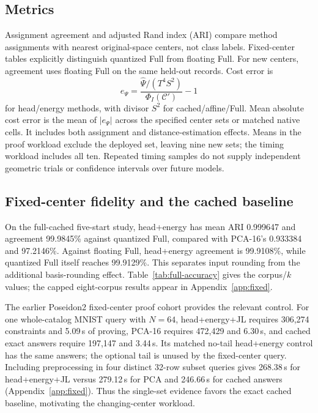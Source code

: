 \subsection{Metrics}
Assignment agreement and adjusted Rand index (ARI) compare method assignments with nearest original-space centers, not class labels. Fixed-center tables explicitly distinguish quantized Full from floating Full. For new centers, agreement uses floating Full on the same held-out records. Cost error is
\begin{equation}
e_\Psi=\frac{\widehat\Psi/(T^4S^2)}{\Phi_I(\mathcal C')}-1
\end{equation}
for head/energy methods, with divisor $S^2$ for cached/affine/Full. Mean absolute cost error is the mean of $|e_\Psi|$ across the specified center sets or matched native cells. It includes both assignment and distance-estimation effects. Means in the proof workload exclude the deployed set, leaving nine new sets; the timing workload includes all ten. Repeated timing samples do not supply independent geometric trials or confidence intervals over future models.



\subsection{Fixed-center fidelity and the cached baseline}\label{sec:results}
On the full-cached five-start study, head+energy has mean ARI 0.999647 and agreement 99.9845\% against quantized Full, compared with PCA-16's 0.933384 and 97.2146\%. Against floating Full, head+energy agreement is 99.9108\%, while quantized Full itself reaches 99.9129\%. This separates input rounding from the additional basis-rounding effect. Table~\ref{tab:full-accuracy} gives the corpus/$k$ values; the capped eight-corpus results appear in Appendix~\ref{app:fixed}.


The earlier Poseidon2 fixed-center proof cohort provides the relevant control. For one whole-catalog MNIST query with $N=64$, head+energy+JL requires 306,274 constraints and 5.09\,s of proving, PCA-16 requires 472,429 and 6.30\,s, and cached exact answers require 197,147 and 3.44\,s. Its matched no-tail head+energy control has the same answers; the optional tail is unused by the fixed-center query. Including preprocessing in four distinct 32-row subset queries gives 268.38\,s for head+energy+JL versus 279.12\,s for PCA and 246.66\,s for cached answers (Appendix~\ref{app:fixed}). Thus the single-set evidence favors the exact cached baseline, motivating the changing-center workload.


